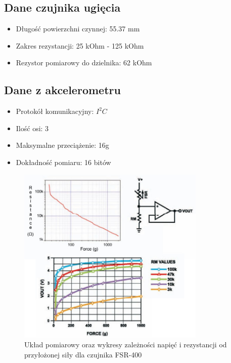 \documentclass[12pt,a4paper]{article}
\begin{document}
\subsection{Dane czujnika ugięcia}
\begin{itemize}
\item Długość powierzchni czynnej: 55.37 mm
\item Zakres rezystancji: 25 kOhm - 125 kOhm
\item Rezystor pomiarowy do dzielnika: 62 kOhm
\end{itemize}
\subsection{Dane z akcelerometru}
\begin{itemize}
\item Protokół komunikacyjny: $I^2C$
\item Ilość osi: 3
\item Maksymalne przeciążenie: 16g
\item Dokładność pomiaru: 16 bitów 
\end{itemize}

\begin{figure}[!htb]
\centering
\includegraphics[width=0.8\textwidth]{images/fsr-400.jpg}
\caption{Układ pomiarowy oraz wykresy zależności napięć i rezystancji od przyłożonej siły dla czujnika FSR-400}
\label{fig:wykresy_fsr-400}
\end{figure}
\end{document}
